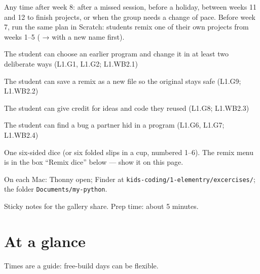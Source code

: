 
\begin{teachernote}
Any time after week 8: after a missed session, before a holiday, between weeks 11 and 12 to finish projects, or when the group needs a change of pace. Before week 7, run the same plan in Scratch: students remix one of their own projects from weeks 1--5 ( →  with a new name first).
\end{teachernote}

\begin{objectives}
  \item The student can choose an earlier program and change it in at least two deliberate ways (L1.G1, L1.G2; L1.WB2.1)
  \item The student can save a remix as a new file so the original stays safe (L1.G9; L1.WB2.2)
  \item The student can give credit for ideas and code they reused (L1.G8; L1.WB2.3)
  \item The student can find a bug a partner hid in a program (L1.G6, L1.G7; L1.WB2.4)
\end{objectives}

\begin{materials}
  \item One six-sided dice (or six folded slips in a cup, numbered 1--6). The remix menu is in the box \enquote{Remix dice} below --- show it on this page.
  \item On each Mac: Thonny open; Finder at \texttt{kids-coding/1-elementry/excercises/}; the folder \texttt{Documents/my-python}.
  \item Sticky notes for the gallery share. Prep time: about 5 minutes.
\end{materials}

\section{At a glance}
Times are a guide: free-build days can be flexible.
\begin{timeplan}
\end{timeplan}

